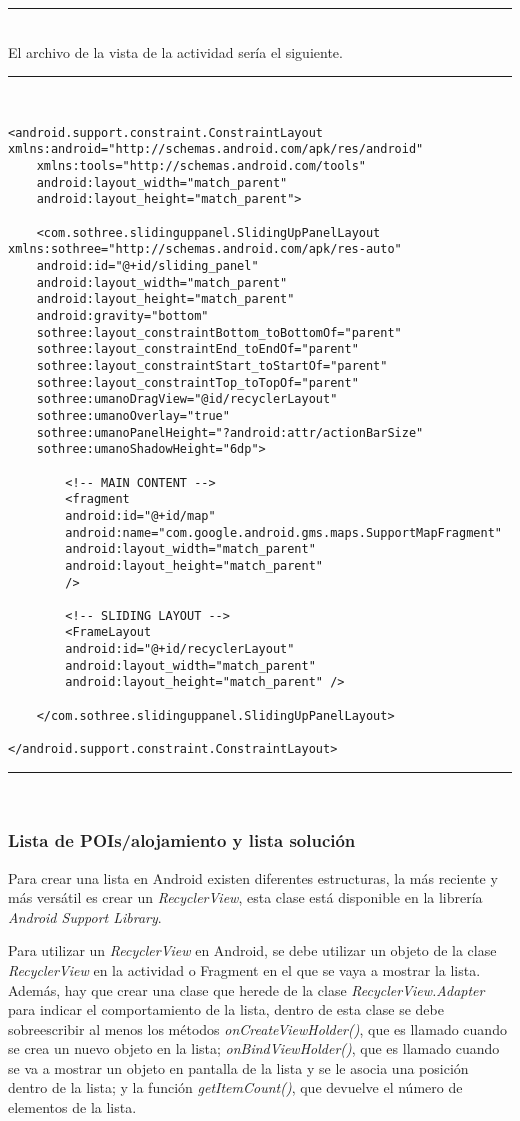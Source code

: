 \noindent\rule[-1ex]{\textwidth}{1pt}\\
\newpage
El archivo de la vista de la actividad sería el siguiente.\newline
\noindent\rule[-1ex]{\textwidth}{1pt}\\
\begin{lstlisting}[caption=Código XML de la vista de la actividad principal.]
<android.support.constraint.ConstraintLayout xmlns:android="http://schemas.android.com/apk/res/android"
	xmlns:tools="http://schemas.android.com/tools"
	android:layout_width="match_parent"
	android:layout_height="match_parent">

	<com.sothree.slidinguppanel.SlidingUpPanelLayout xmlns:sothree="http://schemas.android.com/apk/res-auto"
	android:id="@+id/sliding_panel"
	android:layout_width="match_parent"
	android:layout_height="match_parent"
	android:gravity="bottom"
	sothree:layout_constraintBottom_toBottomOf="parent"
	sothree:layout_constraintEnd_toEndOf="parent"
	sothree:layout_constraintStart_toStartOf="parent"
	sothree:layout_constraintTop_toTopOf="parent"
	sothree:umanoDragView="@id/recyclerLayout"
	sothree:umanoOverlay="true"
	sothree:umanoPanelHeight="?android:attr/actionBarSize"
	sothree:umanoShadowHeight="6dp">

		<!-- MAIN CONTENT -->
		<fragment
		android:id="@+id/map"
		android:name="com.google.android.gms.maps.SupportMapFragment"
		android:layout_width="match_parent"
		android:layout_height="match_parent"
		/>
		
		<!-- SLIDING LAYOUT -->
		<FrameLayout
		android:id="@+id/recyclerLayout"
		android:layout_width="match_parent"
		android:layout_height="match_parent" />
	
	</com.sothree.slidinguppanel.SlidingUpPanelLayout>

</android.support.constraint.ConstraintLayout>
\end{lstlisting}
\noindent\rule[-1ex]{\textwidth}{1pt}\\
\subsubsection{Lista de POIs/alojamiento y lista solución}
Para crear una lista en Android existen diferentes estructuras, la más reciente y más versátil es crear un \textit{RecyclerView}, esta clase está disponible en la librería \textit{Android Support Library}.\newline

Para utilizar un \textit{RecyclerView} en Android, se debe utilizar un objeto de la clase \textit{RecyclerView} en la actividad o Fragment en el que se vaya a mostrar la lista. Además, hay que crear una clase que herede de la clase \textit{RecyclerView.Adapter} para indicar el comportamiento de la lista, dentro de esta clase se debe sobreescribir al menos los métodos \textit{onCreateViewHolder()}, que es llamado cuando se crea un nuevo objeto en la lista; \textit{onBindViewHolder()}, que es llamado cuando se va a mostrar un objeto en pantalla de la lista y se le asocia una posición dentro de la lista; y la función \textit{getItemCount()}, que devuelve el número de elementos de la lista.\newline


